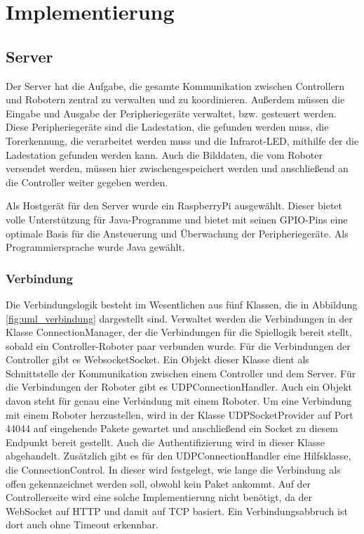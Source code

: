 \chapter{Implementierung}
\label{ch:implementierung}

\section{Server}
\label{impl:server}
Der Server hat die Aufgabe, die gesamte Kommunikation zwischen Controllern und Robotern zentral zu verwalten und zu koordinieren. Außerdem müssen die Eingabe und Ausgabe der Peripheriegeräte verwaltet, bzw. gesteuert werden. Diese Peripheriegeräte sind die Ladestation, die gefunden werden muss, die Torerkennung, die verarbeitet werden muss und die Infrarot-LED, mithilfe der die Ladestation gefunden werden kann. Auch die Bilddaten, die vom Roboter versendet werden, müssen hier zwischengespeichert werden und anschließend an die Controller weiter gegeben werden.

Als Hostgerät für den Server wurde ein RaspberryPi ausgewählt. Dieser bietet volle Unterstützung für Java-Programme und bietet mit seinen GPIO-Pins eine optimale Basis für die Ansteuerung und Überwachung der Peripheriegeräte. 
Als Programmiersprache wurde Java gewählt.


\subsection{Verbindung}
Die Verbindungslogik besteht im Wesentlichen aus fünf Klassen, die in Abbildung \ref{fig:uml_verbindung} dargestellt sind. Verwaltet werden die Verbindungen in der Klasse ConnectionManager, der die Verbindungen für die Spiellogik bereit stellt, sobald ein Controller-Roboter paar verbunden wurde. Für die Verbindungen der Controller gibt es WebsocketSocket. Ein Objekt dieser Klasse dient als Schnittstelle der Kommunikation zwischen einem Controller und dem Server. Für die Verbindungen der Roboter gibt es UDPConnectionHandler. Auch ein Objekt davon steht für genau eine Verbindung mit einem Roboter. Um eine Verbindung mit einem Roboter herzustellen, wird in der Klasse UDPSocketProvider auf Port 44044 auf eingehende Pakete gewartet und anschließend ein Socket zu diesem Endpunkt bereit gestellt. Auch die Authentifizierung wird in dieser Klasse abgehandelt. Zusätzlich gibt es für den UDPConnectionHandler eine Hilfsklasse, die ConnectionControl. In dieser wird festgelegt, wie lange die Verbindung als offen gekennzeichnet werden soll, obwohl kein Paket ankommt. Auf der Controllerseite wird eine solche Implementierung nicht benötigt, da der WebSocket auf HTTP und damit auf TCP basiert. Ein Verbindungsabbruch ist dort auch ohne Timeout erkennbar.


